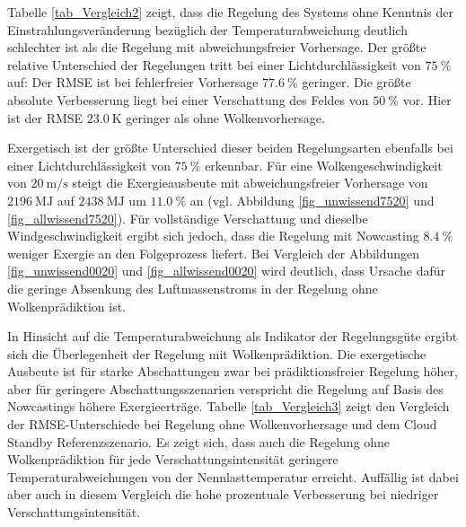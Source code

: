 Tabelle \ref{tab_Vergleich2} zeigt, dass die Regelung des Systems ohne Kenntnis der Einstrahlungsveränderung bezüglich der Temperaturabweichung deutlich schlechter ist als die Regelung mit abweichungsfreier Vorhersage.
Der größte relative Unterschied der Regelungen tritt bei einer Lichtdurchlässigkeit von $\SI{75}{\percent}$ auf: Der RMSE ist bei fehlerfreier Vorhersage $\SI{77.6}{\percent}$ geringer.
Die größte absolute Verbesserung liegt bei einer Verschattung des Feldes von $\SI{50}{\percent}$ vor.
Hier ist der RMSE $\SI{23.0}{\kelvin}$ geringer als ohne Wolkenvorhersage.\pagebreak

Exergetisch ist der größte Unterschied dieser beiden Regelungsarten ebenfalls bei einer Lichtdurchlässigkeit von $\SI{75}{\percent}$ erkennbar.
Für eine Wolkengeschwindigkeit von $\SI{20}{\metre\per\second}$ steigt die Exergieausbeute mit abweichungsfreier Vorhersage von $\SI{2196}{\mega\joule}$ auf $\SI{2438}{\mega\joule}$ um $\SI{11.0}{\percent}$ an (vgl. Abbildung \ref{fig_unwissend7520} und \ref{fig_allwissend7520}).
Für vollständige Verschattung und dieselbe Windgeschwindigkeit ergibt sich jedoch, dass die Regelung mit Nowcasting $\SI{8.4}{\percent}$ weniger Exergie an den Folgeprozess liefert.
Bei Vergleich der Abbildungen \ref{fig_unwissend0020} und \ref{fig_allwissend0020} wird deutlich, dass Ursache dafür die geringe Absenkung des Luftmassenstroms in der Regelung ohne Wolkenprädiktion ist.

In Hinsicht auf die Temperaturabweichung als Indikator der Regelungsgüte ergibt sich die Überlegenheit der Regelung mit Wolkenprädiktion.
Die exergetische Ausbeute ist für starke Abschattungen zwar bei prädiktionsfreier Regelung höher, aber für geringere Abschattungsszenarien verspricht die Regelung auf Basis des Nowcastings höhere Exergieerträge.
Tabelle \ref{tab_Vergleich3} zeigt den Vergleich der RMSE-Unterschiede bei Regelung ohne Wolkenvorhersage und dem Cloud Standby Referenzszenario.
Es zeigt sich, dass auch die Regelung ohne Wolkenprädiktion für jede Verschattungsintensität geringere Temperaturabweichungen von der Nennlasttemperatur erreicht.
Auffällig ist dabei aber auch in diesem Vergleich die hohe prozentuale Verbesserung bei niedriger Verschattungsintensität.

